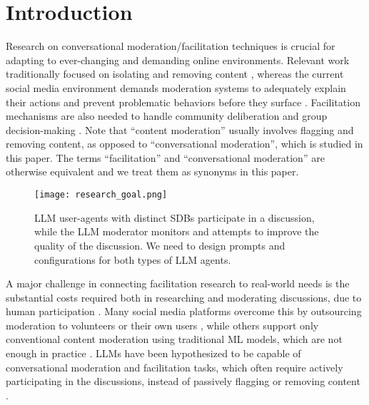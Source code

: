 %
\section{Introduction}
\label{sec:introduction}

Research on conversational moderation/facilitation techniques is crucial for adapting to ever-changing and demanding online environments. Relevant work traditionally focused on isolating and removing content \cite{seering_self_moderation, cresci_pesonalized_interventions}, whereas the current social media environment demands moderation systems to adequately explain their actions and prevent problematic behaviors before they surface \cite{cho-etal-2024-language, seering_self_moderation, cresci_pesonalized_interventions, make_reddit_great}.  Facilitation mechanisms are also needed to handle community deliberation and group decision-making \cite{kim_et_al_chatbot, seering_self_moderation}. Note that “content moderation” usually involves flagging and removing content, as opposed to “conversational moderation”, which is studied in this paper. The terms “facilitation” and “conversational moderation” are otherwise equivalent \cite{argyle2023, korre2025evaluation, falk-etal-2021-predicting} and we treat them as synonyms in this paper.

\begin{figure}[t]
	\centering
	\texttt{[image: research\_goal.png]}
	\caption{\ac{LLM} user-agents with distinct \acp{SDB} participate in a discussion, while the \ac{LLM} moderator monitors and attempts to improve the quality of the discussion. We need to design prompts and configurations for both types of \ac{LLM} agents.}
	\label{fig::goals}
\end{figure}


A major challenge in connecting facilitation research to real-world needs is    the substantial costs required both in researching and moderating discussions, due to human participation \cite{rossi_2024}. Many social media platforms overcome this by outsourcing moderation to volunteers or their own users \cite{Matias2019TheCL, schaffner_community_guidelines}, while others support only conventional content moderation using traditional \ac{ML} models, which are not enough in practice \cite{horta_automated_moderation, schaffner_community_guidelines}. \acfp{LLM} have been hypothesized to be capable of conversational moderation and facilitation tasks, which often require actively participating in the discussions, instead of passively flagging or removing content \cite{small-polis-llm, korre2025evaluation}. 

